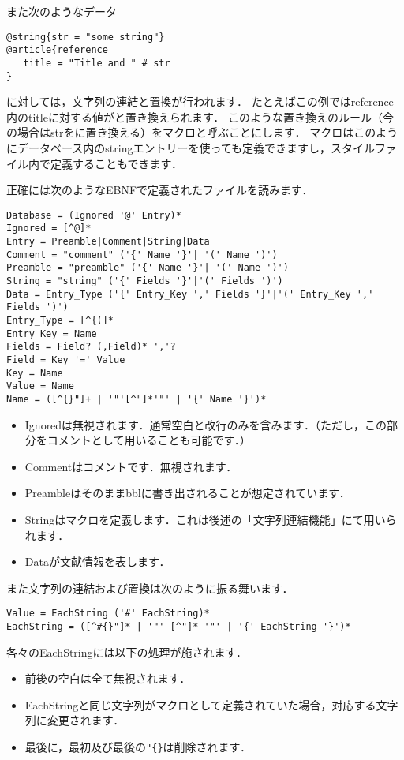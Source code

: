 \documentclass[a4paper]{ltjsarticle}
\begin{document}
また次のようなデータ
\begin{verbatim}
@string{str = "some string"}
@article{reference
   title = "Title and " # str
}
\end{verbatim}
に対しては，文字列の連結と置換が行われます．
たとえばこの例ではreference内のtitleに対する値がと置き換えられます．
このような置き換えのルール（今の場合はstrをに置き換える）をマクロと呼ぶことにします．
マクロはこのようにデータベース内のstringエントリーを使っても定義できますし，スタイルファイル内で定義することもできます．


正確には次のようなEBNFで定義されたファイルを読みます．
\begin{verbatim}
Database = (Ignored '@' Entry)*
Ignored = [^@]*
Entry = Preamble|Comment|String|Data
Comment = "comment" ('{' Name '}'| '(' Name ')')
Preamble = "preamble" ('{' Name '}'| '(' Name ')')
String = "string" ('{' Fields '}'|'(' Fields ')')
Data = Entry_Type ('{' Entry_Key ',' Fields '}'|'(' Entry_Key ',' Fields ')')
Entry_Type = [^{(]*
Entry_Key = Name
Fields = Field? (,Field)* ','?
Field = Key '=' Value
Key = Name
Value = Name
Name = ([^{}"]+ | '"'[^"]*'"' | '{' Name '}')*
\end{verbatim}

\begin{itemize}
\item Ignoredは無視されます．通常空白と改行のみを含みます．（ただし，この部分をコメントとして用いることも可能です．）
\item Commentはコメントです．無視されます．
\item Preambleはそのままbblに書き出されることが想定されています．
\item Stringはマクロを定義します．これは後述の「文字列連結機能」にて用いられます．
\item Dataが文献情報を表します．
\end{itemize}


また文字列の連結および置換は次のように振る舞います．
\begin{verbatim}
Value = EachString ('#' EachString)*
EachString = ([^#{}"]* | '"' [^"]* '"' | '{' EachString '}')*
\end{verbatim}
各々のEachStringには以下の処理が施されます．
\begin{itemize}
\item 前後の空白は全て無視されます．
\item EachStringと同じ文字列がマクロとして定義されていた場合，対応する文字列に変更されます．
\item 最後に，最初及び最後の\verb|"{}|は削除されます．
\end{itemize}
\end{document}
